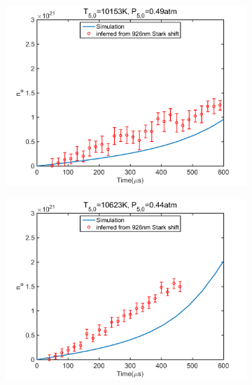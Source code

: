 \documentclass[12pt]{iopart}
\begin{document}
\begin{figure}[h]
  \centering
    \begin{subfigure}[b]{0.4\textwidth}
     \includegraphics[width=\textwidth]{10153K_049atm_ne_sim_926.png}
    \caption{\label{fig:} }
      \end{subfigure} %
      \begin{subfigure}[b]{0.4\textwidth}
     \includegraphics[width=\textwidth]{10623K_044atm_ne_sim_926.png}
      \caption{\label{fig:} }
      \end{subfigure}
    \begin{subfigure}[b]{0.4\textwidth}

\end{subfigure}
\end{figure}
\end{document}
